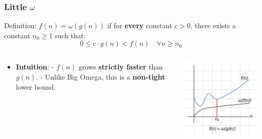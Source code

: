 \begin{frame}
  \frametitle{Little $\omega$}

  \begin{block}{Definition:}
        $f(n) = \omega(g(n))$ if for \textbf{every} constant $c > 0$, there exists a constant $n_0 \geq 1$ such that:
        \[
          0 \leq c \cdot g(n) < f(n) \quad \forall n \geq n_0
        \]
\end{block}
        
  \begin{columns}

    \begin{column}{0.7\textwidth} 
      \begin{itemize}
        \item \textbf{Intuition}:  
        - $f(n)$ grows \textbf{strictly faster} than $g(n)$.  
        - Unlike Big Omega, this is a \textbf{non-tight} lower bound.  
        \vspace{3pt}
      \end{itemize}
    \end{column}

    \begin{column}{0.3\textwidth} 
      \includegraphics[width=\textwidth]{figures/MasterTheorem/little_omega.jpg}
    \end{column}
  \end{columns}
\end{frame}

